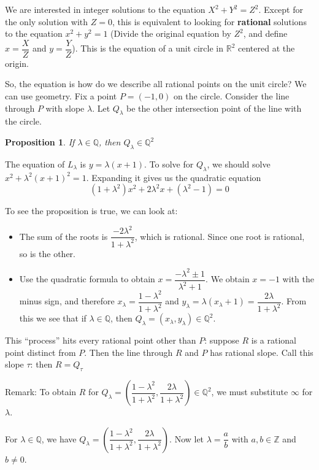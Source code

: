\documentclass[12pt,titlepage]{article}
\newtheorem{protonotation}[prototheorem]{Proposition}
\newenvironment{proposition}
{\colorlet{shadecolor}{green!15}\begin{shaded}\begin{protonotation}\normalfont}{\end{protonotation}\end{shaded}}
\begin{document}
We are interested in integer solutions to the equation $X^2 + Y^2 = Z^2$. Except for the only solution with $Z = 0$, this is equivalent to looking for \textbf{rational} solutions to the equation $x^2 + y^2 = 1$ (Divide the original equation by $Z^2$, and define $x = \dfrac{X}{Z}$ and $y = \dfrac{Y}{Z}$). This is the equation of a unit circle in $\mathbb{R}^2$ centered at the origin. 

So, the equation is how do we describe all rational points on the unit circle? We can use geometry. Fix a point $P = (-1,0)$ on the circle. Consider the line through $P$ with slope $\lambda$. Let $Q_\lambda$ be the other intersection point of the line with the circle. 

\begin{proposition}
	If $\lambda \in \mathbb{Q}$, then $Q_\lambda \in \mathbb{Q}^2$
\end{proposition}
The equation of $L_\lambda$ is $y = \lambda(x+1)$. To solve for $Q_\lambda$, we should solve $x^2 + \lambda^2(x+1)^2 = 1$. Expanding it gives us the quadratic equation $$(1+\lambda^2)x^2 + 2\lambda^2x+(\lambda^2-1) = 0$$

To see the proposition is true, we can look at: \begin{itemize}
	\item The sum of the roots is $\dfrac{-2\lambda^2}{1+\lambda^2}$, which is rational. Since one root is rational, so is the other. 
	\item Use the quadratic formula to obtain $x = \dfrac{-\lambda^2 \pm 1}{\lambda^2+1}$. We obtain $x=-1$ with the minus sign, and therefore $x_\lambda = \dfrac{1-\lambda^2}{1+\lambda^2}$ and $y_\lambda = \lambda(x_\lambda + 1) = \dfrac{2\lambda}{1+\lambda^2}$. From this we see that if $\lambda \in \mathbb{Q}$, then $Q_\lambda = (x_\lambda, y_\lambda) \in \mathbb{Q}^2$. 
\end{itemize}

This ``process'' hits every rational point other than $P$: suppose $R$ is a rational point distinct from $P$. Then the line through $R$ and $P$ has rational slope. Call this slope $\tau$:  then $R = Q_\tau$

Remark: To obtain $R$ for $Q_\lambda = (\dfrac{1-\lambda^2}{1+\lambda^2}, \dfrac{2\lambda}{1+\lambda^2}) \in \mathbb{Q}^2$, we must substitute $\infty$ for $\lambda$. 

For $\lambda \in \mathbb{Q}$, we have $Q_\lambda = (\dfrac{1-\lambda^2}{1+\lambda^2}, \dfrac{2\lambda}{1+\lambda^2})$. Now let $\lambda = \dfrac{a}{b}$ with $a, b \in \mathbb{Z}$ and $b \neq 0$. 
\end{document}
